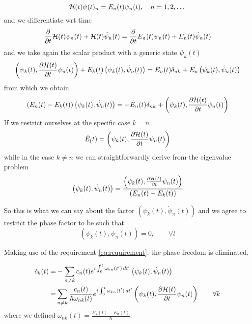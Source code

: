 \begin{equation}
\mathcal{H}(t) \psi(t)_n=E_n(t)\psi_n(t), \quad n=1,2,\dots  
\end{equation}
and we differentiate wrt time
\begin{equation}
\frac{\partial }{\partial t}\mathcal{H}(t)\psi_n(t) +\mathcal{H}(t)\dot{\psi}_n(t)=\frac{\partial }{\partial t}E_n(t)\psi_n(t)+E_n(t)\dot{\psi}_n(t)
\end{equation}
and we take again the scalar product with a generic state $ \psi_k(t) $
\begin{equation}
\left(\psi_k(t),\frac{\partial \mathcal{H}(t)}{\partial t}\psi_n(t) \right)+E_k(t)\left(\psi_k(t),\dot{\psi}_n(t) \right)=\dot{E}_n(t)\delta_{nk}+E_n\left(\psi_k(t),\dot{\psi}_n(t) \right)
\end{equation}
from which we obtain
\begin{equation}
\left(E_n(t)-E_k(t)\right)\left(\psi_k(t),\dot{\psi}_n(t) \right)=-\dot{E}_n(t)\delta_{nk}+\left(\psi_k(t),\frac{\partial \mathcal{H}(t)}{\partial t}\psi_n(t) \right)
\end{equation}
If we restrict ourselves at the specific case $ k=n $
\begin{equation}
\dot{E}_(t)=\left(\psi_k(t),\frac{\partial \mathcal{H}(t)}{\partial t}\psi_n(t) \right)
\end{equation}
while in the case $ k\neq n $ we can straightforwardly derive from the eigenvalue problem
\begin{equation}
\left(\psi_k(t),\dot{\psi}_n(t)\right)=\frac{\left(\psi_k(t),\frac{\partial \mathcal{H}(t)}{\partial t}\psi_n(t) \right)}{\left(E_n(t)-E_k(t)\right)}
\end{equation}

So this is what we can say about the factor $ \left(\psi_k(t),\dot{\psi}_n(t)\right) $ and we agree to restrict the phase factor to be such that 
\begin{equation}
\left(\psi_k(t),\dot{\psi}_n(t)\right)=0, \qquad \forall t
\label{eq:requirement}
\end{equation}
\begin{rem}
	Making use of the requirement \eqref{eq:requirement}, the phase freedom is eliminated.
\end{rem}

\begin{align}
\dot{c}_k(t)=&-\sum_{n\neq k}c_n(t)e^{i\int_0^t\omega_{kn}(t')\mathop{}\!d t'} \left(\psi_k(t),\dot{\psi}_n(t)\right) \\
=&\sum_{n\neq k} \frac{c_n(t)}{\hbar\omega_{nk}(t)}e^{i\int_0^t\omega_{kn}(t')\mathop{}\!d t'}\left(\psi_k(t),\frac{\partial \mathcal{H}(t)}{\partial t}\psi_n(t) \right) \qquad \forall k
\end{align}
where we defined $ \omega_{nk}(t)=\frac{E_k(t)-E_n(t)}{\hbar} $.


